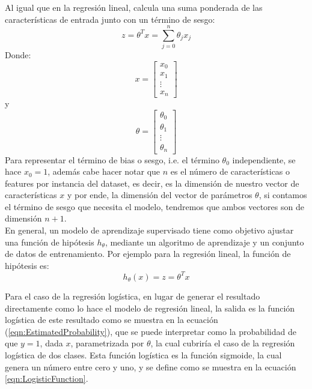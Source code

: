\documentclass[runningheads]{llncs}
\begin{document}
\noindent
Al igual que en la regresión lineal, calcula una suma ponderada de las características de entrada junto con un término de sesgo:
\begin{equation}
    z = \theta^{T}x = \sum_{j=0}^{n}\theta_jx_j
\end{equation}
Donde:
\begin{equation}
    x = \begin{bmatrix}
           x_{0} \\
           x_{1} \\
           \vdots \\
           x_{n}
         \end{bmatrix}
\end{equation}
y
\begin{equation}
    \theta = \begin{bmatrix}
           \theta_{0} \\
           \theta_{1} \\
           \vdots \\
           \theta_{n}
         \end{bmatrix}
\end{equation}
Para representar el término de bias o sesgo, i.e. el término $\theta_0$ independiente, se hace $x_0 = 1$, además cabe hacer notar que $n$ es el número de características o features por instancia del dataset, es decir, es la dimensión de nuestro vector de características $x$ y por ende, la dimensión del vector de parámetros $\theta$, si contamos el término de sesgo que necesita el modelo, tendremos que ambos vectores son de dimensión $n + 1$.\\
En general, un modelo de aprendizaje supervisado tiene como objetivo ajustar una función de hipótesis $h_{\theta}$, mediante un algoritmo de aprendizaje y un conjunto de datos de entrenamiento. Por ejemplo para la regresión lineal, la función de hipótesis es:
\begin{equation}
    h_{\theta}(x) = z = \theta^{T}x
\end{equation}

Para el caso de la regresión logística, en lugar de generar el resultado directamente como lo hace el modelo de regresión lineal, la salida es la función logística de este resultado como se muestra en la ecuación (\ref{eqn:EstimatedProbability}), que se puede interpretar como  la probabilidad de que $y = 1$, dada $x$, parametrizada por $\theta$, la cual cubriría el caso de la regresión logística de dos clases. Esta función logística es la función sigmoide, la cual genera un número entre cero y uno, y se define como se muestra en la ecuación \ref{eqn:LogisticFunction}.
\end{document}
